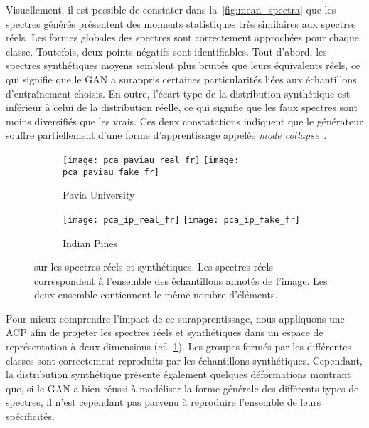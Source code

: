 Visuellement, il est possible de constater dans la~\cref{fig:mean_spectra} que les spectres générés présentent des moments statistiques très similaires aux spectres réels. Les formes globales des spectres sont correctement approchées pour chaque classe. Toutefois, deux points négatifs sont identifiables. Tout d'abord, les spectres synthétiques moyens semblent plus bruités que leurs équivalents réels, ce qui signifie que le \gls{GAN} a surappris certaines particularités liées aux échantillons d'entraînement choisis. En outre, l'écart-type de la distribution synthétique est inférieur à celui de la distribution réelle, ce qui signifie que les faux spectres sont moins diversifiés que les vrais. Ces deux constatations indiquent que le générateur souffre partiellement d'une forme d'apprentissage appelée \emph{mode collapse}~\cite{salimans_improved_2016}.

\begin{figure}[t]
\begin{subfigure}{\textwidth}
\texttt{[image: pca\_paviau\_real\_fr]}%
\texttt{[image: pca\_paviau\_fake\_fr]}%
\caption{Pavia University}
\end{subfigure}
\begin{subfigure}{\textwidth}
\texttt{[image: pca\_ip\_real\_fr]}%
\texttt{[image: pca\_ip\_fake\_fr]}%
\caption{Indian Pines}
\end{subfigure}
\caption[ sur les spectres réels et synthétiques.]{ sur les spectres réels et synthétiques. Les spectres réels correspondent à l'ensemble des échantillons annotés de l'image. Les deux ensemble contiennent le même nombre d'éléments.}
\label{fig:pca}
\end{figure}

Pour mieux comprendre l'impact de ce surapprentissage, nous appliquons une \gls{ACP} afin de projeter les spectres réels et synthétiques dans un espace de représentation à deux dimensions (cf.~\cref{fig:pca}). Les groupes formés par les différentes classes sont correctement reproduits par les échantillons synthétiques. Cependant, la distribution synthétique présente également quelques déformations montrant que, si le \gls{GAN} a bien réussi à modéliser la forme générale des différents types de spectres, il n'est cependant pas parvenu à reproduire l'ensemble de leurs spécificités.

